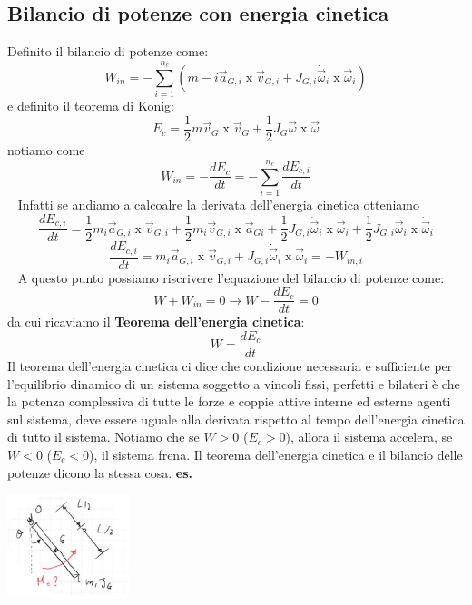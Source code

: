 \subsection{Bilancio di potenze con energia cinetica}
Definito il bilancio di potenze come:
\[
    W_{in} = - \sum_{i=1}^{n_c} \left( m-i \vec{a}_{G,i} \;\text{x}\; \vec{v}_{G,i} + J_{G,i} \dot{\vec{\omega}}_i \;\text{x}\;\vec{\omega}_i \right)
\]
e definito il teorema di Konig:
\[
    E_c= \frac{1}{2} m \vec{v}_G \;\text{x}\; \vec{v}_G + \frac{1}{2} J_G \vec{\omega} \;\text{x}\; \vec{\omega} 
\]
notiamo come 
\[
    W_{in} = - \frac{dE_c}{dt} = - \sum_{i=1}^{n_c} \frac{d E_{c,i}}{dt}
\]
\ \newline
Infatti se andiamo a calcoalre la derivata dell'energia cinetica otteniamo
\[
    \frac{dE_{c,i} }{dt} = \frac{1}{2} m_i \vec{a}_{G,i} \; \text{x}\; \vec{v}_{G,i} + \frac{1}{2} m_i \vec{v}_{G,i} \; \text{x}\; \vec{a}_{Gi} + \frac{1}{2} J_{G,i} \dot{\vec{\omega}}_i \; \text{x}\;\vec{\omega}_i + \frac{1}{2} J_{G,i} \vec{\omega}_i \;\text{x}\; \dot{\vec{\omega}}_i
\]
\[
    \frac{dE_{c,i} }{dt} = m_i \vec{a}_{G,i} \; \text{x}\; \vec{v}_{G,i} + J_{G,i} \dot{\vec{\omega}}_i \; \text{x}\; \vec{\omega}_i = - W_{in,i}
\]
\ \newline
A questo punto possiamo riscrivere l'equazione del bilancio di potenze come:
\[
    W + W_{in} = 0 \rightarrow W- \frac{dE_c}{dt} = 0
\]
da cui ricaviamo il \textbf{Teorema dell'energia cinetica}:
\[
    W = \frac{dE_c}{dt}
\]
Il teorema dell'energia cinetica ci dice che condizione necessaria e sufficiente per l'equilibrio dinamico di un sistema soggetto a vincoli fissi, perfetti e bilateri è che la potenza complessiva di tutte le forze e coppie attive interne ed esterne agenti sul sistema, deve essere uguale alla derivata rispetto al tempo dell'energia cinetica di tutto il sistema.\newline
\newline
Notiamo che se $W > 0$ ($E_c > 0$), allora il sistema accelera, se $W < 0$ ($E_c < 0$), il sistema frena.\newline
\newline
Il teorema dell'energia cinetica e il bilancio delle potenze dicono la stessa cosa.\newline
\newline
\textbf{es.} 
\begin{center}
    \includegraphics[height=3cm]{../lezione10/img3.JPG}
\end{center}
